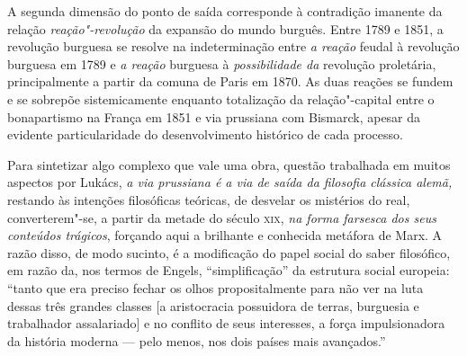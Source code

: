 A segunda dimensão do ponto de saída corresponde à contradição imanente
da relação \emph{reação"-revolução} da expansão do mundo burguês. Entre
1789 e 1851, a revolução burguesa se resolve na indeterminação entre
\emph{a reação} feudal à revolução burguesa em 1789 e \emph{a reação}
burguesa à \emph{possibilidade da} revolução proletária, principalmente
a partir da comuna de Paris em 1870. As duas reações se fundem e se
sobrepõe sistemicamente enquanto totalização da relação"-capital entre o
bonapartismo na França em 1851 e via prussiana com Bismarck, apesar da
evidente particularidade do desenvolvimento histórico de cada processo.

Para sintetizar algo complexo que vale uma obra, questão trabalhada em
muitos aspectos por Lukács, \emph{a via prussiana é a via de saída da
filosofia clássica alemã,} restando às intenções filosóficas teóricas,
de desvelar os mistérios do real, converterem"-se, a partir da metade do
século \textsc{xix}, \emph{na forma farsesca dos seus conteúdos
trágicos}, forçando aqui a brilhante e conhecida metáfora de Marx. A
razão disso, de modo sucinto, é a modificação do papel social do saber
filosófico, em razão da, nos termos de Engels, ``simplificação'' da
estrutura social europeia: ``tanto que era preciso fechar os olhos
propositalmente para não ver na luta dessas três grandes classes {[}a
aristocracia possuidora de terras, burguesia e trabalhador
assalariado{]} e no conflito de seus interesses, a força impulsionadora
da história moderna --- pelo menos, nos dois países mais avançados.''

